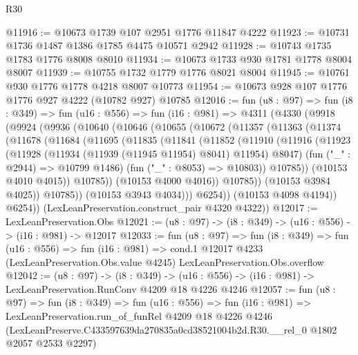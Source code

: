 \begin{lexlean}{R30}
\begin{coremodule}
@11916 := @10673 @1739 @107 @2951 @1776 @11847 @4222
@11923 := @10731 @1736 @1487 @1386 @1785 @4475 @10571 @2942
@11928 := @10743 @1735 @1783 @1776 @8008 @8010
@11934 := @10673 @1733 @930 @1781 @1778 @8004 @8007
@11939 := @10755 @1732 @1779 @1776 @8021 @8004
@11945 := @10761 @930 @1776 @1778 @4218 @8007 @10773
@11954 := @10673 @928 @107 @1776 @1776 @927 @4222 (@10782 @927) @10785
@12016 := fun (u8 : @97) =>
  fun (i8 : @349) =>
  fun (u16 : @556) =>
  fun (i16 : @981) =>
  @4311
    (@4330
      (@9918
        (@9924
          (@9936
            (@10640
              (@10646
                (@10655
                  (@10672
                    (@11357
                      (@11363
                        (@11374
                          (@11678
                            (@11684
                              (@11695
                                (@11835
                                  (@11841
                                    (@11852
                                      (@11910
                                        (@11916
                                          (@11923
                                            (@11928
                                              (@11934 (@11939 (@11945 @11954) @8041) @11954)
                                              @8047)
                                            (fun ("_" : @2944) => @10799 @1486)
                                            (fun ("_" : @8053) => @10803))
                                          @10785))
                                      (@10153 @4010 @4015))
                                    @10785))
                                (@10153 @4000 @4016))
                              @10785))
                          (@10153 @3984 @4025))
                        @10785))
                    (@10153 @3943 @4034)))
                @6254))
            (@10153 @4098 @4194))
          @6254))
      (LexLeanPreservation.construct_pair @4320 @4322))
@12017 := LexLeanPreservation.Obs
@12021 := (u8 : @97) -> (i8 : @349) -> (u16 : @556) -> (i16 : @981) -> @12017
@12033 := fun (u8 : @97) =>
  fun (i8 : @349) =>
  fun (u16 : @556) =>
  fun (i16 : @981) =>
  cond.{1} @12017 @4233 (LexLeanPreservation.Obs.value @4245) LexLeanPreservation.Obs.overflow
@12042 := (u8 : @97) ->
  (i8 : @349) -> (u16 : @556) -> (i16 : @981) -> LexLeanPreservation.RunConv @4209 @18 @4226 @4246
@12057 := fun (u8 : @97) =>
  fun (i8 : @349) =>
  fun (u16 : @556) =>
  fun (i16 : @981) =>
  LexLeanPreservation.run_of_funRel
    @4209
    @18
    @4226
    @4246
    (LexLeanPreserve.C433597639da270835a0cd38521004b2d.R30.__rel_0 @1802 @2057 @2533 @2297)
\end{coremodule}
\end{lexlean}
